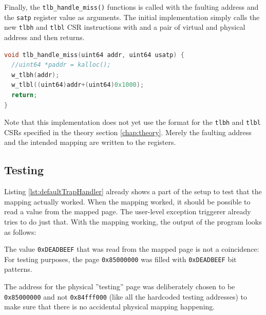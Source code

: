 Finally, the \texttt{tlb\_handle\_miss()} functions is called with the faulting address and the \texttt{satp} register
value as arguments.
The initial implementation simply calls the new \texttt{tlbh} and \texttt{tlbl} CSR instructions with and a pair of virtual and physical address and then
returns.
\begin{lstlisting}[language={C},float=h!,
    label={lst:defaultTrapHandler}, caption={Simple TLB miss exception handler for a single fixed address}]
void tlb_handle_miss(uint64 addr, uint64 usatp) {
  //uint64 *paddr = kalloc();
  w_tlbh(addr);
  w_tlbl((uint64)addr+(uint64)0x1000);
  return;
}
\end{lstlisting}

Note that this implementation does not yet use the format for the \texttt{tlbh} and \texttt{tlbl} CSRs specified
in the theory section \ref{chap:theory}.
Merely the faulting address and the intended mapping are written to the registers.

\subsection{Testing}
Listing \ref{lst:defaultTrapHandler} already shows a part of the setup to test that the mapping actually worked.
When the mapping worked, it should be possible to read a value from the mapped page.
The user-level exception triggerer already tries to do just that.
With the mapping working, the output of the program looks as follows:


The value \texttt{0xDEADBEEF} that was read from the mapped page is not a coincidence:
For testing purposes, the page \texttt{0x85000000} was filled with \texttt{0xDEADBEEF} bit patterns.

The address for the physical ''testing'' page was deliberately chosen to be \texttt{0x85000000} and not
\texttt{0x84fff000} (like all the hardcoded testing addresses) to make sure that there is no accidental physical
mapping happening.






